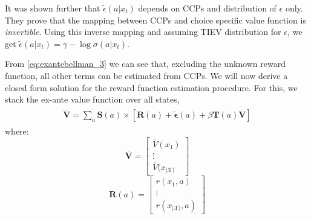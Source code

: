 \documentclass{article}
\begin{document}
It was shown further that $\tilde{\epsilon}(a|x_t)$ depends on CCPs and distribution of $\epsilon$ only. They prove that the mapping between CCPs and choice specific value function is \emph{invertible}. Using this inverse mapping and assuming TIEV distribution for $\epsilon$, we get $\tilde{\epsilon}(a|x_t) = \gamma - \log \sigma(a|x_t)$.



From \eqref{eq:exantebellman_3} we can see that, excluding the unknown reward function, all other terms can be estimated from CCPs. We will now derive a closed form solution for the reward function estimation procedure. For this, we stack the ex-ante value function over all states,
\begin{align} \label{eq:exantebellman_4}
    \begin{split}
    \overline{\mathbf{V}}=\sum_{a}\mathbf{S}(a) \times \left[\mathbf{R}(a)+\tilde{\bm{\epsilon}}(a)+\beta \mathbf{T}(a) \overline{\mathbf{V}}\right]
    \end{split}
\end{align}
where:
\[
\overline{\mathbf{V}}=\left[\begin{array}{c}\overline{V}(x_1)\\\vdots\\\overline{V}(x_{|\mathcal{X}|}\end{array}\right]
\]
\[
\mathbf{R}(a)=\left[\begin{array}{c}r(x_1,a)\\\vdots\\ r(x_{|\mathcal{X}|},a)\end{array}\right]
\]
\end{document}
